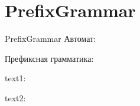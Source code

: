 \section{PrefixGrammar}
\begin{frame}{PrefixGrammar}
	Автомат:


	Префиксная грамматика:


	text1:


	text2:


\end{frame}


